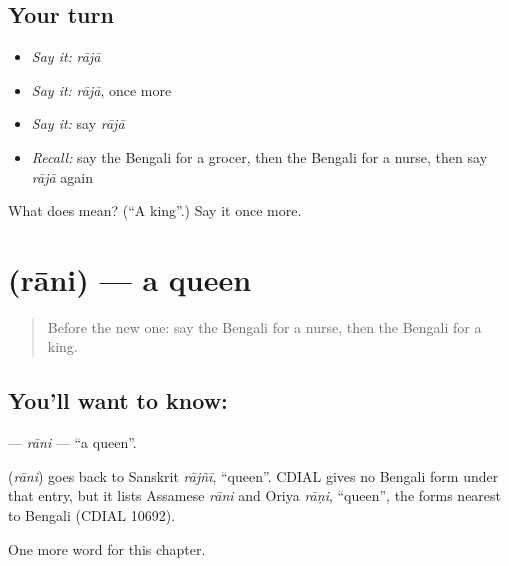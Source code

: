 \subsection*{Your turn}
\begin{itemize}
\raggedright
  \item \emph{Say it:} \emph{rājā}
  \item \emph{Say it:} \emph{rājā}, once more
  \item \emph{Say it:} say \emph{rājā}
  \item \emph{Recall:} say the Bengali for a grocer, then the Bengali for a nurse, then say \emph{rājā} again
\end{itemize}

\begin{tcolorbox}[breakable,colback=teal!4,colframe=teal!35!black,title={Before you move on}]
What does  mean? (\textquotedblleft{}A king\textquotedblright{}.) Say it once more.
\end{tcolorbox}
\section[\texorpdfstring{\bn{রানি} (rāni)}{রানি (rāni)}]{ (rāni) — a queen}

\label{lesson:BN-C127-rani}



\begin{quote}
Before the new one: say the Bengali for a nurse, then the Bengali for a king.
\end{quote}

\subsection*{You'll want to know: }
\textbf{} — \emph{rāni} — \textquotedblleft{}a queen\textquotedblright{}.

\begin{cousinweb}
\textbf{} (\emph{rāni}) goes back to Sanskrit \emph{rājñī}, \textquotedblleft{}queen\textquotedblright{}. CDIAL gives no Bengali form under that entry, but it lists Assamese \emph{rāni} and Oriya \emph{rāṇi}, \textquotedblleft{}queen\textquotedblright{}, the forms nearest to Bengali (CDIAL 10692).
\end{cousinweb}

\begin{grammarlens}[title={What you've built}]
One more word for this chapter.
\end{grammarlens}

